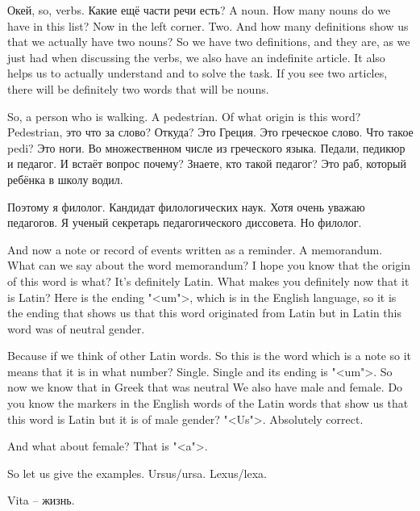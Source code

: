 \documentclass[main.tex]{subfiles}
\begin{document}
Окей, so, verbs.
Какие ещё части речи есть?
A noun.
How many nouns do we have in this list?
Now in the left corner.
Two.
And how many definitions show us that we actually have two nouns?
So we have two definitions, and they are, as we just had when discussing the verbs, we also have an indefinite article.
It also helps us to actually understand and to solve the task.
If you see two articles, there will be definitely two words that will be nouns.

So, a person who is walking.
A pedestrian.
Of what origin is this word?
Pedestrian, это что за слово?
Откуда?
Это Греция.
Это греческое слово.
Что такое pedi? Это ноги.
Во множественном числе из греческого языка.
Педали, педикюр и педагог.
И встаёт вопрос почему?
Знаете, кто такой педагог?
Это раб, который ребёнка в школу водил.

Поэтому я филолог.
Кандидат филологических наук.
Хотя очень уважаю педагогов.
Я ученый секретарь педагогического диссовета.
Но филолог.

And now a note or record of events written as a reminder.
A memorandum.
What can we say about the word memorandum?
I hope you know that the origin of this word is what?
It's definitely Latin.
What makes you definitely now that it is Latin?
Here is the ending "<um">, which is in the English language, so it is the ending that shows us that this word originated from Latin but in Latin this word was of neutral gender.

Because if we think of other Latin words.
So this is the word which is a note so it means that it is in what number?
Single.
Single and its ending is "<um">.
So now we know that in Greek that was neutral
We also have male and female.
Do you know the markers in the English words of the Latin words that show us that this word is Latin but it is of male gender?
"<Us">.
Absolutely correct.

And what about female?
That is "<a">.

So let us give the examples.
Ursus/ursa.
Lexus/lexa.

Vita -- жизнь.
\end{document}
